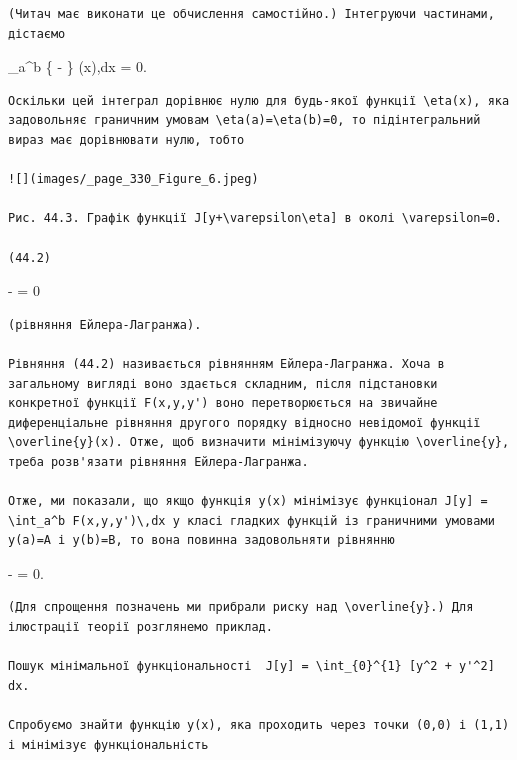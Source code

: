 \documentclass[
  ukrainian,
]{article}
\begin{document}
\begin{verbatim}
(Читач має виконати це обчислення самостійно.) Інтегруючи частинами, дістаємо
\end{verbatim}


\equiv \int\_a\^{}b \left\{  -
\right\}
\eta(x),dx = 0.

\begin{verbatim}
Оскільки цей інтеграл дорівнює нулю для будь-якої функції \eta(x), яка задовольняє граничним умовам \eta(a)=\eta(b)=0, то підінтегральний вираз має дорівнювати нулю, тобто

![](images/_page_330_Figure_6.jpeg)

Рис. 44.3. Графік функції J[y+\varepsilon\eta] в околі \varepsilon=0.

(44.2)
\end{verbatim}

 -
 = 0

\begin{verbatim}
(рівняння Ейлера-Лагранжа).

Рівняння (44.2) називається рівнянням Ейлера-Лагранжа. Хоча в загальному вигляді воно здається складним, після підстановки конкретної функції F(x,y,y') воно перетворюється на звичайне диференціальне рівняння другого порядку відносно невідомої функції \overline{y}(x). Отже, щоб визначити мінімізуючу функцію \overline{y}, треба розв'язати рівняння Ейлера-Лагранжа.

Отже, ми показали, що якщо функція y(x) мінімізує функціонал J[y] = \int_a^b F(x,y,y')\,dx у класі гладких функцій із граничними умовами y(a)=A і y(b)=B, то вона повинна задовольняти рівнянню
\end{verbatim}

 -
 = 0.

\begin{verbatim}
(Для спрощення позначень ми прибрали риску над \overline{y}.) Для ілюстрації теорії розглянемо приклад.

Пошук мінімальної функціональності  J[y] = \int_{0}^{1} [y^2 + y'^2] dx.

Спробуємо знайти функцію y(x), яка проходить через точки (0,0) і (1,1) і мінімізує функціональність
\end{verbatim}
\end{document}
